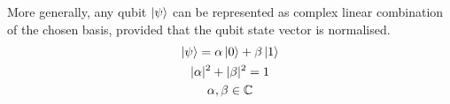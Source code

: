 More generally, any qubit $\ket\psi$ can be represented as complex linear combination of the chosen basis, provided that the qubit state vector is normalised.
\begin{equation*}
\begin{gathered}
    \ket \psi = \alpha\ket 0 + \beta\ket 1 \\
    |\alpha|^2 + |\beta|^2 = 1 \\
    \alpha, \beta \in \mathbb{C}
\end{gathered}
\end{equation*}

